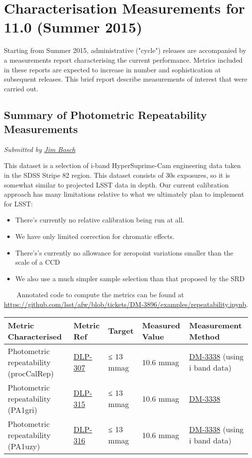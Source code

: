 \section{Characterisation Measurements for 11.0 (Summer
2015)}\label{characterisation-measurements-for-11.0-summer-2015}

Starting from Summer 2015, administrative ("cycle") releases are
accompanied by a measurements report characterising the current
performance. Metrics included in these reports are expected to increase
in number and sophistication at subsequent releases. This brief report
describe measurements of interest that were carried out.

\subsection{Summary of Photometric Repeatability
Measurements}\label{summary-of-photometric-repeatability-measurements}

\emph{Submitted by \href{file:////display/~jbosch}{Jim Bosch}}

This dataset is a selection of i-band HyperSuprime-Cam engineering data
taken in the SDSS Stripe 82 region. This dataset consists of 30s
exposures, so it is somewhat similar to projected LSST data in depth.
Our current calibration approach has many limitations relative to what
we ultimately plan to implement for LSST:

\begin{itemize}
\item
  There's currently no relative calibration being run at all.
\item
  We have only limited correction for chromatic effects.
\item
  There's's currently no allowance for zeropoint variations smaller than
  the scale of a CCD
\item
  We also use a much simpler sample selection than that proposed by the
  SRD
\end{itemize}

\emph{~~~} Annotated code to compute the metrics can be found at
\url{https://github.com/lsst/afw/blob/tickets/DM-3896/examples/repeatability.ipynb}.

\begin{longtable}[]{@{}lllll@{}}
\toprule
\textbf{Metric Characterised} & \textbf{Metric Ref} & \textbf{Target} &
\textbf{Measured Value} & \textbf{Measurement Method}\tabularnewline
\midrule
\endhead
Photometric repeatability (procCalRep) &
\href{https://jira.lsstcorp.org/browser/DLP-307}{DLP-307} & ≤ 13 mmag &
10.6 mmag & \href{https://jira.lsstcorp.org/browse/DM-3338}{DM-3338}
(using i band data)\tabularnewline
Photometric repeatability (PA1gri) &
\href{https://jira.lsstcorp.org/browse/DLP-315}{DLP-315} & ≤ 13 mmag &
10.6 mmag &
\href{https://jira.lsstcorp.org/browse/DM-3338}{DM-3338}\tabularnewline
Photometric repeatability (PA1uzy) &
\href{https://jira.lsstcorp.org/browse/DLP-316}{DLP-316} & ≤ 13 mmag &
10.6 mmag & \href{https://jira.lsstcorp.org/browse/DM-3338}{DM-3338}
(using i band data)\tabularnewline
\bottomrule
\end{longtable}

